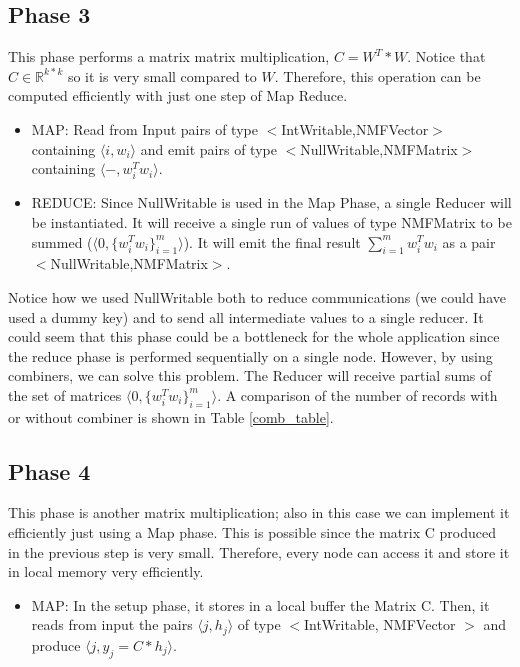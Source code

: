 \documentclass[a4paper,12pt]{article}
\begin{document}
\subsection{Phase 3}
\label{sec:phase3}

This phase performs a matrix matrix multiplication, $C=W^T*W$.
Notice that $C \in \mathbb{R}^{k*k}$ so it is very small compared to $W$.
Therefore, this operation can be computed efficiently with just one step of Map Reduce.

       \begin{itemize}

         \item MAP: Read from Input pairs of type $<$IntWritable,NMFVector$>$ containing $\langle i, w_i \rangle$ and emit pairs of type $<$NullWritable,NMFMatrix$>$ containing  $\langle -,w_i^T w_i \rangle$.

          \item REDUCE: Since NullWritable is used in the Map Phase, a single Reducer will be instantiated. It will receive a single run of values of type NMFMatrix to be summed ($\langle 0,\{w_i^T w_i\}_{i=1}^{m} \rangle $). It will emit the final result $\sum_{i=1}^{m} w_i^T w_i$ as a pair $<$NullWritable,NMFMatrix$>$.

       \end{itemize}
Notice how we used NullWritable both to reduce communications (we could have used a dummy key) and to send all intermediate values to a single reducer.
It could seem that this phase could be a bottleneck for the whole application since the reduce phase is performed sequentially on a single node.
However, by using combiners, we can solve this problem.
The Reducer will receive partial sums of the set of matrices $\langle 0,\{w_i^T w_i\}_{i=1}^{m} \rangle $.
A comparison of the number of records with or without combiner is shown in Table \ref{comb_table}.

\subsection{Phase 4}
\label{sec:phase4}

This phase is another matrix multiplication; also in this case we can implement it efficiently just using a Map phase.
This is possible since the matrix C produced in the previous step is very small.
Therefore, every node can access it and store it in local memory very efficiently.

\begin{itemize}

         \item MAP: In the setup phase, it stores in a local buffer the Matrix C.
         			Then, it reads from input the pairs $ \langle j, h_j \rangle$ of type $<$IntWritable, NMFVector $>$ and produce $ \langle j, y_j = C*h_j \rangle$.

\end{itemize}
\end{document}
